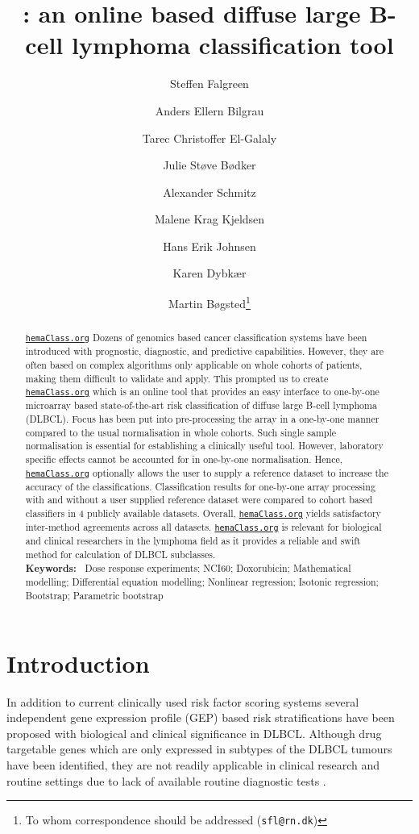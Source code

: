\documentclass{article}
\title{\hemaClass{}: an online based diffuse large B-cell lymphoma classification tool}
\author[1]{Steffen Falgreen}
\author[12]{Anders Ellern Bilgrau}
\author[1]{Tarec Christoffer El-Galaly}
\author[1]{Julie St{\o}ve  B{\o}dker}
\author[1]{Alexander Schmitz}
\author[1]{Malene Krag Kjeldsen}
\author[1]{Hans Erik Johnsen}
\author[1]{Karen Dybk{\ae}r}
\author[13]{Martin B{\o}gsted\thanks{To whom correspondence should be addressed (\texttt{sfl@rn.dk})}}
\affil[1]{Department of Haematology, Aalborg University Hospital}
\affil[2]{Department of Mathematical Sciences, Aalborg University}
\affil[3]{Department of Clinical Medicine, Aalborg University}
\newcommand{\hemaClass}{\href{http://hemaClass.org}{\texttt{hemaClass.org}}}
\begin{document}
\maketitle
{}
{}
\begin{abstract}
\hemaClass{} Dozens of genomics based cancer classification systems have been introduced with prognostic, diagnostic, and predictive capabilities.
However, they are often based on complex algorithms only applicable on whole cohorts of patients, making them difficult to validate and apply.
This prompted us to create \hemaClass{} which is an online tool that provides an easy interface to one-by-one microarray based state-of-the-art risk classification of diffuse large B-cell lymphoma (DLBCL).
Focus has been put into pre-processing the array in a one-by-one manner compared to the usual normalisation in whole cohorts.
Such single sample normalisation is essential for establishing a clinically useful tool.
However, laboratory specific effects cannot be accounted for in one-by-one normalisation.
Hence, \hemaClass{} optionally allows the user to supply a reference dataset to increase the accuracy of the classifications.
Classification results for one-by-one array processing with and without a user supplied reference dataset were compared to cohort based classifiers in 4 publicly available datasets.
Overall, \hemaClass{} yields satisfactory inter-method agreements across all datasets.
\hemaClass{} is relevant for biological and clinical researchers in the lymphoma field as it provides a reliable and swift method for calculation of DLBCL subclasses.
\medskip\\
\textbf{Keywords:~}
Dose response experiments; NCI60; Doxorubicin; Mathematical modelling; Differential equation modelling; Nonlinear regression; Isotonic regression; Bootstrap; Parametric bootstrap
\end{abstract}



\section{Introduction}

In addition to current clinically used risk factor scoring systems several independent gene expression profile (GEP) based risk stratifications have been proposed with biological and clinical significance in DLBCL.
Although drug targetable genes which are only expressed in subtypes of the DLBCL tumours have been identified, they are not readily applicable in clinical research and routine settings due to lack of available routine diagnostic tests \citep{Jaffe2009}.
\end{document}

